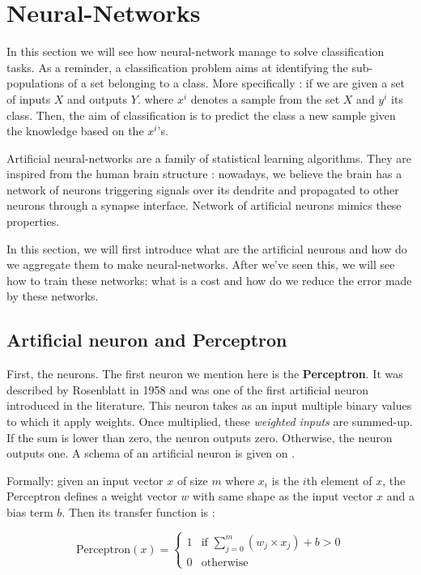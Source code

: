 
\section{Neural-Networks}
\label{sec:neural_networks}

	In this section we will see how neural-network manage to solve classification tasks. As a reminder, a classification problem aims at identifying the sub-populations of a set belonging to a class. More specifically : if we are given a set of inputs $X$ and outputs $Y$. where $x^i$ denotes a sample from the set $X$ and $y^i$ its class. Then, the aim of classification is to predict the class a new sample given the knowledge based on the $x^i$'s.

	Artificial neural-networks are a family of statistical learning algorithms. They are inspired from the human brain structure : nowadays, we believe the brain has a network of neurons triggering signals over its dendrite and propagated to other neurons through a synapse interface. Network of artificial neurons mimics these properties.

	In this section, we will first introduce what are the artificial neurons and how do we aggregate them to make neural-networks. After we've seen this, we will see how to train these networks: what is a cost and how do we reduce the error made by these networks.


	\subsection{Artificial neuron and Perceptron}
	\label{sec:Artificial_neurons}
		First, the neurons. The first neuron we mention here is the \textbf{Perceptron}. It was described by Rosenblatt in 1958 \cite{rosenblatt1958perceptron} and was one of the first artificial neuron introduced in the literature. This neuron takes as an input multiple binary values to which it apply weights. Once multiplied, these \textit{weighted inputs} are summed-up. If the sum is lower than zero, the neuron outputs zero. Otherwise, the neuron outputs one. A schema of an artificial neuron is given on .

		Formally: given an input vector $x$ of size $m$ where $x_i$ is the $i$th element of $x$, the Perceptron defines a weight vector $w$ with same shape as the input vector $x$ and a bias term $b$. Then its transfer function is :

		$$ \text{Perceptron}(x) = \begin{cases}1 & \text{if } \sum_{j=0}^m (w_j \times x_j) + b > 0\\0 & \text{otherwise}\end{cases} $$

